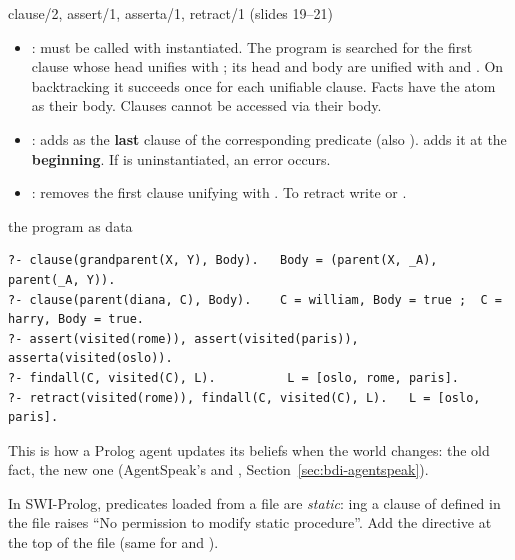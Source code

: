 \begin{nbdef}{clause/2, assert/1, asserta/1, retract/1 (slides 19--21)}
\begin{itemize}
  \item {}: must be called with  instantiated. The program
        is searched for the first clause whose head unifies with ; its head and
        body are unified with  and . On backtracking it succeeds once
        for each unifiable clause. Facts have the atom  as their body. Clauses
        cannot be accessed via their body.
  \item {}: adds  as the \textbf{last} clause of the
        corresponding predicate (also ).  adds it at the
        \textbf{beginning}. If  is uninstantiated, an error occurs.
  \item {}: removes the first clause unifying with . To
        retract  write  or
        .
\end{itemize}
\end{nbdef}

\begin{nbexample}{the program as data}
\notinslides
\begin{verbatim}
?- clause(grandparent(X, Y), Body).   Body = (parent(X, _A), parent(_A, Y)).
?- clause(parent(diana, C), Body).    C = william, Body = true ;  C = harry, Body = true.
?- assert(visited(rome)), assert(visited(paris)), asserta(visited(oslo)).
?- findall(C, visited(C), L).          L = [oslo, rome, paris].
?- retract(visited(rome)), findall(C, visited(C), L).   L = [oslo, paris].
\end{verbatim}
This is how a Prolog agent updates its beliefs when the world changes:  the old
fact,  the new one (AgentSpeak's  and ,
Section~\ref{sec:bdi-agentspeak}).
\end{nbexample}

\begin{nbwarning}
In SWI-Prolog, predicates loaded from a file are \emph{static}: ing a clause of
 defined in the file raises ``No permission to modify static procedure''.
Add the directive  at the top of the file (same for
 and ).
\end{nbwarning}

